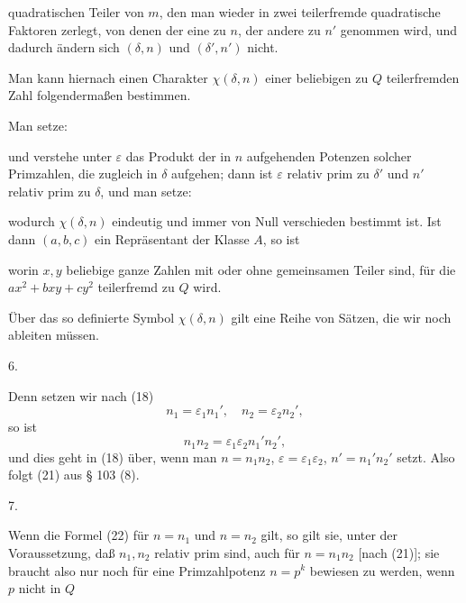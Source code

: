 
quadratischen Teiler von $m$, den man wieder in zwei teilerfremde
quadratische Faktoren zerlegt, von denen der eine zu $n$, der andere
zu $n'$ genommen wird, und dadurch ändern sich $(\delta, n)$ und
$(\delta', n')$ nicht.

Man kann hiernach einen Charakter $\chi(\delta, n)$ einer beliebigen
zu $Q$ teilerfremden Zahl folgendermaßen bestimmen.

Man setze:


und verstehe unter $\varepsilon$ das Produkt der in $n$ aufgehenden Potenzen
solcher Primzahlen, die zugleich in $\delta$ aufgehen; dann ist $\varepsilon$ relativ
prim zu $\delta'$ und $n'$ relativ prim zu $\delta$, und man setze:


wodurch $\chi(\delta, n)$ eindeutig und immer von Null verschieden bestimmt ist. Ist dann $(a, b, c)$ ein Repräsentant der Klasse $A$,
so ist


worin $x, y$ beliebige ganze Zahlen mit oder ohne gemeinsamen
Teiler sind, für die $ax^2 + bxy + cy^2$ teilerfremd zu $Q$ wird.

Über das so definierte Symbol $\chi(\delta, n)$ gilt eine Reihe von
Sätzen, die wir noch ableiten müssen.

6. 


Denn setzen wir nach (18)
\[
n_1 = \varepsilon_1 n_1', \quad n_2 = \varepsilon_2 n_2',
\]
so ist
\[
n_1 n_2 = \varepsilon_1 \varepsilon_2 n_1' n_2',
\]
und dies geht in (18) über, wenn man $n = n_1n_2$, $\varepsilon = \varepsilon_1\varepsilon_2$,
$n' = n_1'n_2'$ setzt. Also folgt (21) aus § 103 (8).

7. 


Wenn die Formel (22) für $n = n_1$ und $n = n_2$ gilt, so gilt
sie, unter der Voraussetzung, daß $n_1, n_2$ relativ prim sind, auch
für $n = n_1n_2$ [nach (21)]; sie braucht also nur noch für eine
Primzahlpotenz $n = p^k$ bewiesen zu werden, wenn $p$ nicht in $Q$
